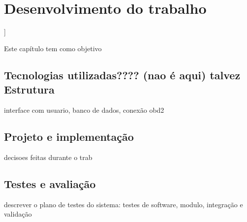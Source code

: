 \chapter{Desenvolvimento do trabalho}]

\label{CAP5}


Este capítulo tem como objetivo 


\section{Tecnologias utilizadas???? (nao é aqui) talvez Estrutura}
interface com usuario, banco de dados, conexão obd2

\section{Projeto e implementação}
decisoes feitas durante o trab

\section{Testes e avaliação}
descrever o plano de testes do sistema: testes de software, modulo, integração e validação

